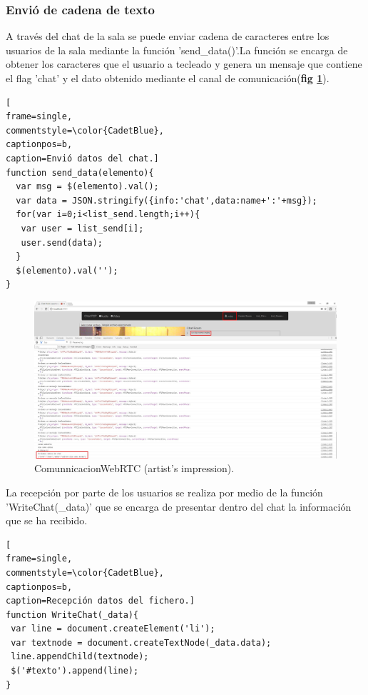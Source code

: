 \subsubsection{Envió de cadena de texto}
A través del chat de la sala se puede enviar cadena de caracteres entre los usuarios de la sala mediante la función 'send\_data()'.La función se encarga de obtener los caracteres que el usuario a tecleado y genera un mensaje que contiene el flag 'chat' y el dato obtenido mediante el canal de comunicación(\textbf{fig \ref{fig:ChatClienteSend}}).
\begin{lstlisting}[
frame=single,
commentstyle=\color{CadetBlue},
captionpos=b,
caption=Envió datos del chat.]
function send_data(elemento){
  var msg = $(elemento).val();
  var data = JSON.stringify({info:'chat',data:name+':'+msg});
  for(var i=0;i<list_send.length;i++){
   var user = list_send[i];
   user.send(data);
  }
  $(elemento).val('');
}
\end{lstlisting}
\begin{figure}[!h]
\centering
\includegraphics[width=0.8\linewidth]{Figures/ChatClienteSend}
\decoRule
\caption[An Electron]{ComunnicacionWebRTC (artist's impression).}
\label{fig:ChatClienteSend}
\end{figure}
La recepción por parte de los usuarios se realiza por medio de la función 'WriteChat(\_data)' que se encarga de presentar dentro del chat la información que se ha recibido.
\begin{lstlisting}[
frame=single,
commentstyle=\color{CadetBlue},
captionpos=b,
caption=Recepción datos del fichero.]
function WriteChat(_data){
 var line = document.createElement('li');
 var textnode = document.createTextNode(_data.data);
 line.appendChild(textnode);
 $('#texto').append(line);
}
\end{lstlisting}
